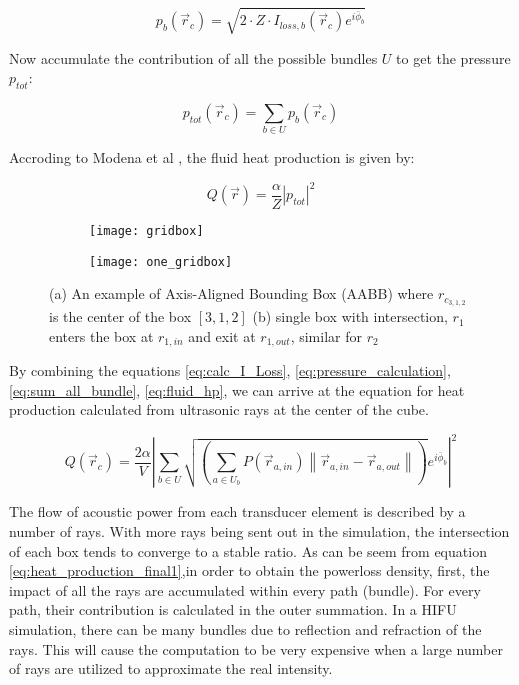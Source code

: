 \begin{equation} \label{eq:pressure_calculation}
    p_b(\vec{r}_c)=\sqrt{2\cdot Z\cdot I_{loss,b}(\vec{r}_c)e^{i\bar{\phi}_b}}
\end{equation}

Now accumulate the contribution of all the possible bundles $U$ to get the pressure $p_{tot}$:

\begin{equation} \label{eq:sum_all_bundle}
    p_{tot}(\vec{r}_c)=\sum_{b \in U}p_b(\vec{r}_c)
\end{equation}

Accroding to Modena et al \cite{Modena_2018}, the fluid heat production is given by:

\begin{equation} \label{eq:fluid_hp}
    Q(\vec{r})=\frac{\alpha}{Z}|p_{tot}|^2
\end{equation}

\begin{figure}
    \centering
    \begin{subfigure}[b]{0.45\textwidth}
        \texttt{[image: gridbox]}
        \caption{}
        \label{fig:gridbox}
    \end{subfigure}
    \begin{subfigure}[b]{0.5\textwidth}
        \texttt{[image: one\_gridbox]}
        \caption{}
        \label{fig:one_gridbox}
    \end{subfigure}
    \caption{(a) An example of Axis-Aligned Bounding Box (AABB) where $r_{c_{3,1,2}}$ is the center of the box $[3,1,2]$ (b) single box with intersection, $r_1$ enters the box at $r_{1,in}$ and exit at $r_{1,out}$, similar for $r_2$}
\end{figure}

By combining the equations \ref{eq:calc_I_Loss}, \ref{eq:pressure_calculation}, \ref{eq:sum_all_bundle}, \ref{eq:fluid_hp}, we can arrive at the equation for heat production calculated from ultrasonic rays at the center of the cube.

\begin{equation} \label{eq:heat_production_final1}
    Q(\vec{r}_c)=\frac{2\alpha}{V}\left|\sum_{b \in U}\sqrt{(\sum_{a \in U_b}P(\vec{r}_{a,in})\left\|\vec{r}_{a,in}-\vec{r}_{a,out}\right\|)} e^{i\bar{\phi}_b}\right|^2
\end{equation}

The flow of acoustic power from each transducer element is described by a number of rays\cite{sonalleve}. With more rays being sent out in the simulation, the intersection of each box tends to converge to a stable ratio. As can be seem from equation \ref{eq:heat_production_final1},in order to obtain the powerloss density, first, the impact of all the rays are accumulated within every path (bundle). For every path, their contribution is calculated in the outer summation. In a HIFU simulation, there can be many bundles due to reflection and refraction of the rays. This will cause the computation to be very expensive when a large number of rays are utilized to approximate the real intensity. 

